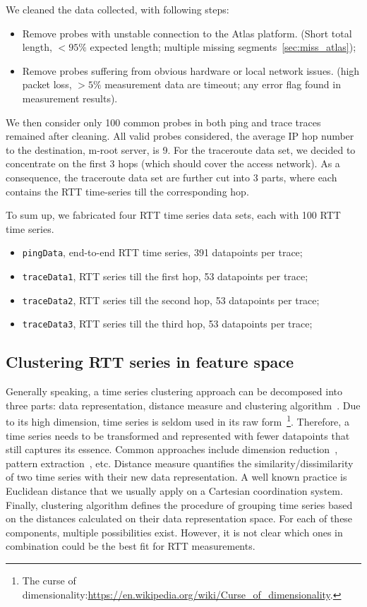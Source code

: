 We cleaned the data collected, with following steps:
\begin{itemize}
\item Remove probes with unstable connection to the Atlas platform. (Short total length,  $< 95\%$ expected length; multiple missing segments~\ref{sec:miss_atlas});
\item Remove probes suffering from obvious hardware or local network issues. (high packet loss, $> 5\%$ measurement data are timeout; any error flag found in measurement results).
\end{itemize}

We then consider only 100 common probes in both ping and trace traces remained after cleaning.
All valid probes considered, the average IP hop number to the destination, m-root server, is 9. 
For the traceroute data set, we decided to concentrate on the first 3 hops (which should cover the access network). As a consequence, the traceroute data set are further cut into 3 parts, where each contains the RTT time-series till the corresponding hop.

To sum up, we fabricated four RTT time series data sets, each with 100 RTT time series.
\begin{itemize}
\item \texttt{pingData}, end-to-end RTT time series, 391 datapoints per trace;
\item \texttt{traceData1}, RTT series till the first hop, 53 datapoints per trace;
\item \texttt{traceData2}, RTT series till the second hop, 53 datapoints per trace;
\item \texttt{traceData3}, RTT series till the third hop, 53 datapoints per trace;
\end{itemize}

\subsection{Clustering RTT series in feature space}
\label{sec:cls_ft}
Generally speaking, a time series clustering approach can be decomposed into three parts: data representation, distance measure and clustering algorithm~\cite{Aghabozorgi2015}. 
Due to its high dimension, time series is seldom used in its raw form~\footnote{The curse of dimensionality:\url{https://en.wikipedia.org/wiki/Curse_of_dimensionality}.}.
Therefore, a time series needs to be transformed and represented with fewer datapoints that still captures its essence.
Common approaches include dimension reduction~\cite{Elhamifar2013}, pattern extraction~\cite{Ulanova2015}, etc.
Distance measure quantifies the similarity/dissimilarity of two time series with their new data representation.
A well known practice is Euclidean distance that we usually apply on a Cartesian coordination system.
Finally, clustering algorithm defines the procedure of grouping time series based on the distances calculated on their data representation space.
For each of these components, multiple possibilities exist. However, it is not clear which ones in combination could be the best fit for RTT measurements. 

